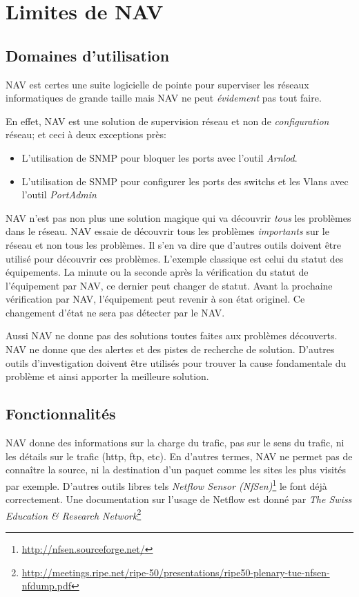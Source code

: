 \section{Limites de NAV}
\subsection{Domaines d'utilisation}
NAV est certes une suite logicielle de pointe pour superviser les réseaux informatiques de grande taille mais NAV ne peut \emph{évidement} pas tout faire.

En effet, NAV est une solution de supervision réseau et non de \emph{configuration} réseau; et ceci à deux exceptions près:
\begin{itemize}
\item L'utilisation de SNMP pour bloquer les ports avec l'outil \emph{Arnlod}.
\item L'utilisation de SNMP pour configurer les ports des switchs et les Vlans avec l'outil \emph{PortAdmin}
\end{itemize}

NAV n'est pas non plus une solution magique qui va découvrir \emph{tous} les problèmes dans le réseau. NAV essaie de découvrir tous les problèmes \emph{importants} sur le réseau et non tous les problèmes. Il s'en va dire que d'autres outils doivent être utilisé pour découvrir ces problèmes. L'exemple classique est celui du statut des équipements. La minute ou la seconde après la vérification du statut de l'équipement par NAV, ce dernier peut changer de statut. Avant la prochaine vérification par NAV, l'équipement peut revenir à son état originel. Ce changement d'état ne sera pas détecter par le NAV.

Aussi NAV ne donne pas des solutions  toutes faites aux problèmes découverts. NAV ne donne que des alertes et des pistes de recherche de solution. D'autres outils d'investigation doivent être utilisés pour trouver la cause fondamentale du problème et ainsi apporter la meilleure solution.


\subsection{Fonctionnalités}
NAV donne des informations sur la charge du trafic, pas sur le sens du trafic, ni les détails sur le trafic (http, ftp, etc). En d'autres termes, NAV ne permet pas de connaître la source, ni la destination d'un paquet comme les sites les plus visités par exemple. D'autres outils libres tels \emph{Netflow Sensor (NfSen)}\footnote{\url{http://nfsen.sourceforge.net/}} le font déjà correctement. Une documentation sur l'usage de Netflow est donné par \emph{The Swiss Education \& Research Network}\footnote{\url{http://meetings.ripe.net/ripe-50/presentations/ripe50-plenary-tue-nfsen-nfdump.pdf}}

